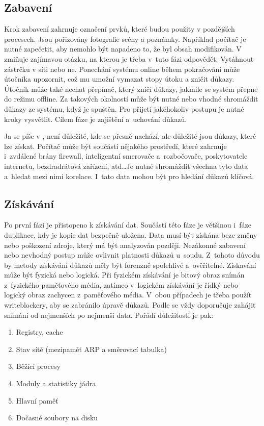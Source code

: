 \documentclass[thesis=B,czech]{FITthesis}[2012/06/26]
\begin{document}
\subsection{Zabavení}
Krok zabavení zahrnuje označení prvků, které budou použity v pozdějších procesech. Jsou pořizovány fotografie scény a poznámky. Například počítač je nutné zapečetit, aby nemohlo být napadeno to, že byl obsah modifikován. V \cite{for_sez} zmiňuje zajímavou otázku, na kterou je třeba v~tuto fázi odpovědět: Vytáhnout zástrčku v síti nebo ne. Ponechání systému online během pokračování může útočníka upozornit, což mu umožní vymazat stopy útoku a zničit důkazy. Útočník může také nechat přepínač, který zničí důkazy, jakmile se systém přepne do režimu offline. Za takových okolností může být nutné nebo vhodné shromáždit důkazy ze systému, když je spuštěn. Pro přijetí jakéhokoliv postupu je nutné kroky vysvětlit. Cílem fáze je zajištění a~uchování důkazů.

Ja se píše v \cite{palmer2002forensic}, není důležité, kde se přesně nachází, ale důležité jsou důkazy, které lze získat. Počítač může být součástí nějakého prostředí, které zahrnuje i~zvdálené brány firewall, inteligentní smerovače a~rozbočovače, poskytovatele internetu, bezdradrátová zařízení, atd\dots Je nutné shromáždit všechna tyto data a~hledat mezi nimi korelace. I~tato data mohou být pro hledání důkazů klíčová.

\subsection{Získávání}
Po první fázi je přistopeno k získávání dat. Součástí této fáze je většinou i~fáze duplikace, kdy je kopie dat bezpečně uložena. Data musí být získána beze změny nebo poškození zdroje, který má být analyzován později. Nezákonné zabavení nebo nevhodný postup může ovlivnit platnosti důkazů u~soudu. Z~tohoto důvodu by metody získávání důkazů měly být forenzně spolehlivé a~ověřitelné. Získavání může být fyzická nebo logická. Při fyzickém získávání je bitový obraz snímán z~fyzického paměťového média, zatímco v~logickém získávání je řídký nebo logický obraz zachycen z~paměťového média. V~obou případech je třeba použít writeblockery, aby se zabránilo úpravě důkazů. Podle \cite{for_sez} se vždy doporučuje zahájit snímání od nejmenších po nejmenší data. Pořádí důležitosti je pak: 

\begin{enumerate}
\item Registry, cache
\item Stav sítě (mezipaměť ARP a směrovací tabulka)
\item Běžící procesy
\item Moduly a statistiky jádra
\item Hlavní paměť
\item Dočasné soubory na disku
\end{enumerate}
\end{document}
